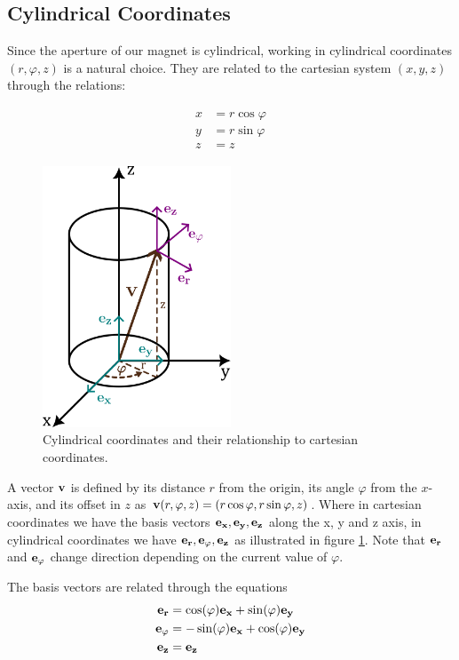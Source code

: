 \subsection{Cylindrical Coordinates}
Since the aperture of our magnet is cylindrical, working in cylindrical
coordinates $(r, \varphi, z)$ is a natural choice. They are related to the cartesian
system $(x, y, z)$ through the relations:

\begin{align}
    \begin{split}
        x &= r\cos \varphi \\
        y &= r\sin \varphi \\
        z &= z
    \end{split}
\end{align}

\begin{figure}
    \includegraphics[width=0.5\textwidth]{figs/cylcoords}
    \caption{Cylindrical coordinates and their relationship to cartesian coordinates.}
    \label{fig:cylcoords}
\end{figure}

A vector $\vb{v}$ is defined by its distance $r$ from the origin, its
angle $\varphi$ from the $x$-axis, and its offset in $z$ as
$\vb{v}(r, \varphi, z)  = (r\cos \varphi, r\sin \varphi, z)$.
Where in cartesian coordinates we have
the basis vectors $\vb{e_x}, \vb{e_y}, \vb{e_z}$
along the x, y and z axis, in cylindrical coordinates we have
$\vb{e_r}, \vb{e_\varphi}, \vb{e_z}$ as illustrated in
figure \ref{fig:cylcoords}. Note that $\vb{e_r}$ and $\vb{e_\varphi}$
change direction depending on the current value of $\varphi$.

The basis vectors are related through the equations
\begin{align}
    \vb{e_r} &= \cos(\varphi)\vb{e_x} + \sin(\varphi)\vb{e_y} \\
    \vb{e_\varphi} &= -\sin(\varphi)\vb{e_x} + \cos(\varphi)\vb{e_y} \\
    \vb{e_z} &= \vb{e_z}
\end{align}


